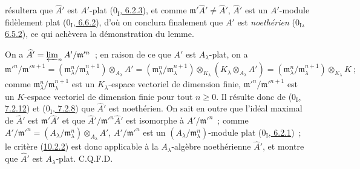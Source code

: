 résultera que $\widehat A'$ est $A'$-plat
(\hyperref[0.6.2.3-fr]{$0_{\mathrm I}$, 6.2.3}), et comme
$\mathfrak m'\widehat A'\ne\widehat A'$, $\widehat A'$ est un $A'$-module
fidèlement plat (\hyperref[0.6.6.2-fr]{$0_{\mathrm I}$, 6.6.2}), d'où on
conclura finalement que $A'$ est \emph{noethérien}
(\hyperref[0.6.5.2-fr]{$0_{\mathrm I}$, 6.5.2}), ce qui achèvera la
démonstration du lemme.

On a $\widehat A'=\varprojlim_n A'/\mathfrak m'^{n}$~; en raison de ce que
$A'$ est $A_\lambda$-plat, on a
\[
  \mathfrak m'^{n}/\mathfrak m'^{n+1}
  =(\mathfrak m_\lambda^n/\mathfrak m_\lambda^{n+1})
    \otimes_{A_\lambda}A'
  =(\mathfrak m_\lambda^n/\mathfrak m_\lambda^{n+1})
    \otimes_{K_\lambda}(K_\lambda\otimes_{A_\lambda}A')
  =(\mathfrak m_\lambda^n/\mathfrak m_\lambda^{n+1})
    \otimes_{K_\lambda}K~;
\]
comme $\mathfrak m_\lambda^n/\mathfrak m_\lambda^{n+1}$ est un
$K_\lambda$-espace vectoriel de dimension finie,
$\mathfrak m'^{n}/\mathfrak m'^{n+1}$ est un $K$-espace vectoriel de
dimension finie pour tout $n\geq0$. Il résulte donc de
(\hyperref[0.7.2.12-fr]{$0_{\mathrm I}$, 7.2.12}) et
(\hyperref[0.7.2.8-fr]{$0_{\mathrm I}$, 7.2.8}) que $\widehat A'$ est
noethérien. On sait en outre que l'idéal maximal de $\widehat A'$ est
$\mathfrak m'\widehat A'$ et que
$\widehat A'/\mathfrak m'^{n}\widehat A'$ est isomorphe à
$A'/\mathfrak m'^{n}$~; comme
$A'/\mathfrak m'^{n}=(A_\lambda/\mathfrak m_\lambda^n)
\otimes_{A_\lambda}A'$, $A'/\mathfrak m'^{n}$ est un
$(A_\lambda/\mathfrak m_\lambda^n)$-module plat
(\hyperref[0.6.2.1-fr]{$0_{\mathrm I}$, 6.2.1})~; le critère
(\hyperref[0.10.2.2-fr]{10.2.2}) est donc applicable à la
$A_\lambda$-algèbre noethérienne $\widehat A'$, et montre que $\widehat A'$
est $A_\lambda$-plat. C.Q.F.D.

